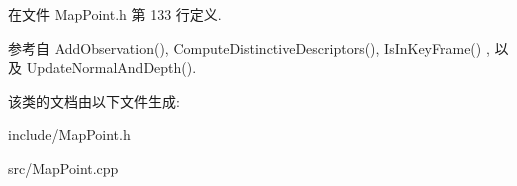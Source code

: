 在文件 Map\-Point.\-h 第 133 行定义.



参考自 Add\-Observation(), Compute\-Distinctive\-Descriptors(), Is\-In\-Key\-Frame() , 以及 Update\-Normal\-And\-Depth().



该类的文档由以下文件生成\-:\begin{DoxyCompactItemize}
\item 
include/Map\-Point.\-h\item 
src/Map\-Point.\-cpp\end{DoxyCompactItemize}
